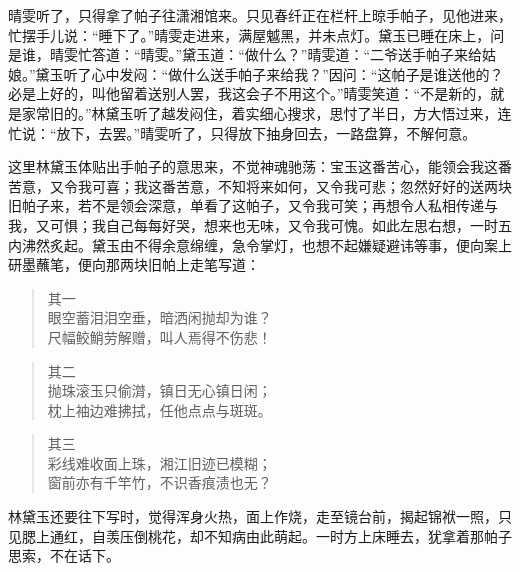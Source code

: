 \documentclass[12pt,oneside]{book}
\newenvironment{shici}{%
\begin{verse}%
\centering\large\hspace{12pt}}%
{\end{verse}}
\begin{document}
晴雯听了，只得拿了帕子往潇湘馆来。只见春纤正在栏杆上晾手帕子，见他进来，忙摆手儿说：“睡下了。”晴雯走进来，满屋魆黑，并未点灯。黛玉已睡在床上，问是谁，晴雯忙答道：“晴雯。”黛玉道：“做什么？”晴雯道：“二爷送手帕子来给姑娘。”黛玉听了心中发闷：“做什么送手帕子来给我？”因问：“这帕子是谁送他的？必是上好的，叫他留着送别人罢，我这会子不用这个。”晴雯笑道：“不是新的，就是家常旧的。”林黛玉听了越发闷住，着实细心搜求，思忖了半日，方大悟过来，连忙说：“放下，去罢。”晴雯听了，只得放下抽身回去，一路盘算，不解何意。

这里林黛玉体贴出手帕子的意思来，不觉神魂驰荡：宝玉这番苦心，能领会我这番苦意，又令我可喜；我这番苦意，不知将来如何，又令我可悲；忽然好好的送两块旧帕子来，若不是领会深意，单看了这帕子，又令我可笑；再想令人私相传递与我，又可惧；我自己每每好哭，想来也无味，又令我可愧。如此左思右想，一时五内沸然炙起。黛玉由不得余意绵缠，急令掌灯，也想不起嫌疑避讳等事，便向案上研墨蘸笔，便向那两块旧帕上走笔写道：

\begin{shici}
其一\\
眼空蓄泪泪空垂，暗洒闲抛却为谁？\\
尺幅鲛鮹劳解赠，叫人焉得不伤悲！
\end{shici}

\begin{shici}
其二\\
抛珠滚玉只偷潸，镇日无心镇日闲；\\
枕上袖边难拂拭，任他点点与斑斑。
\end{shici}

\begin{shici}
其三\\
彩线难收面上珠，湘江旧迹已模糊；\\
窗前亦有千竿竹，不识香痕渍也无？
\end{shici}


林黛玉还要往下写时，觉得浑身火热，面上作烧，走至镜台前，揭起锦袱一照，只见腮上通红，自羡压倒桃花，却不知病由此萌起。一时方上床睡去，犹拿着那帕子思索，不在话下。
\end{document}
